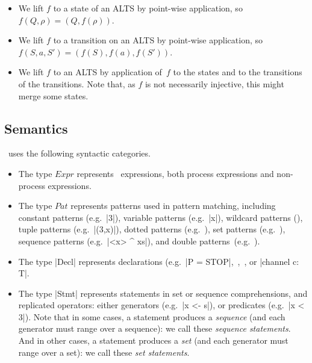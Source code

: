 \begin{itemize}
\item We lift $f$ to a state of an ALTS by point-wise application, so
  $f(Q,\rho) = (Q, f(\rho))$.

\item We lift $f$ to a transition on an ALTS by point-wise application, so
  $f(S,a,S') = (f(S), f(a), f(S'))$.

\item We lift $f$ to an ALTS by application of~$f$ to the states and to the
  transitions of the transitions.  Note that, as $f$ is not necessarily
  injective, this might merge some states.
\end{itemize}



\subsection{Semantics}
\label{sec:semantics}

\CSPm\ uses the following syntactic categories.
%
\begin{itemize}
\item The type $Expr$ represents \CSPm\ expressions, both process expressions
  and non-process expressions.

\item The type $Pat$ represents  patterns used in pattern matching, including
  constant patterns (e.g.~|3|), variable patterns (e.g.~|x|), wildcard
  patterns (\CSPM{\_}), tuple patterns (e.g.~|(3,x)|), dotted patterns
  (e.g.~), set patterns (e.g.~), sequence patterns
  (e.g.~|<x> ^ xs|), and double patterns~(e.g.~).

\item The type |Decl| represents  declarations (e.g.~|P = STOP|,\, ,\, , or |channel c: T|.

\item The type |Stmt| represents statements in set or sequence comprehensions,
  and replicated operators: either generators (e.g.~|x <- s|), or predicates
  (e.g.~|x < 3|).  Note that in some cases, a statement produces a
  \emph{sequence} (and each generator must range over a sequence): we call
  these \emph{sequence statements}.  And in other cases, a statement produces
  a \emph{set} (and each generator must range over a set): we call these
  \emph{set statements}.
\end{itemize}

